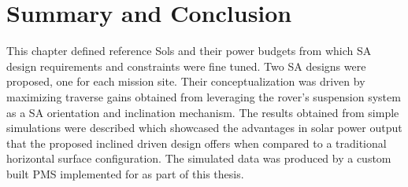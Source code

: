 \section{Summary and Conclusion}
\label{sec:Design:SummaryAndConclusion}
This chapter defined reference Sols and their power budgets from which \ac{SA} design requirements and constraints were fine tuned. Two \ac{SA} designs were proposed, one for each mission site. Their conceptualization was driven by maximizing traverse gains obtained from leveraging the rover's suspension system as a \ac{SA} orientation and inclination mechanism. The results obtained from simple simulations were described which showcased the advantages in solar power output that the proposed inclined driven design offers when compared to a traditional horizontal surface configuration. The simulated data was produced by a custom built \ac{PMS} implemented for as part of this thesis.
